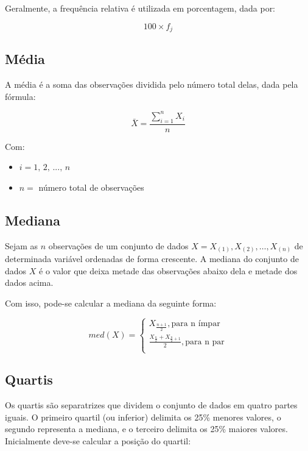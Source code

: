 \documentclass[
]{estat/estat}
\begin{document}
Geralmente, a frequência relativa é utilizada em porcentagem, dada por:

\[100 \times f_j\]

\hypertarget{muxe9dia}{%
\subsection{Média}\label{muxe9dia}}

A média é a soma das observações dividida pelo número total delas, dada
pela fórmula:

\[\bar{X}=\frac{\sum\limits_{i=1}^{n}X_i}{n}\]

Com:

\begin{itemize}
\item
  \(i = 1, \, 2, \, ..., \, n\)
\item
  \(n =\) número total de observações
\end{itemize}

\hypertarget{mediana}{%
\subsection{Mediana}\label{mediana}}

Sejam as \(n\) observações de um conjunto de dados
\(X=X_{(1)},X_{(2)},\ldots, X_{(n)}\) de determinada variável ordenadas
de forma crescente. A mediana do conjunto de dados \(X\) é o valor que
deixa metade das observações abaixo dela e metade dos dados acima.

Com isso, pode-se calcular a mediana da seguinte forma:

\[
med(X) =
    \begin{cases}
         X_{\frac{n+1}{2}}, \textrm{para n ímpar} \\
         \frac{X_{\frac{n}{2}}+X_{\frac{n}{2} + 1}}{2}, \textrm{para n par} \\
    \end{cases}
\]

\hypertarget{quartis}{%
\subsection{Quartis}\label{quartis}}

Os quartis são separatrizes que dividem o conjunto de dados em quatro
partes iguais. O primeiro quartil (ou inferior) delimita os 25\% menores
valores, o segundo representa a mediana, e o terceiro delimita os 25\%
maiores valores. Inicialmente deve-se calcular a posição do quartil:
\end{document}
